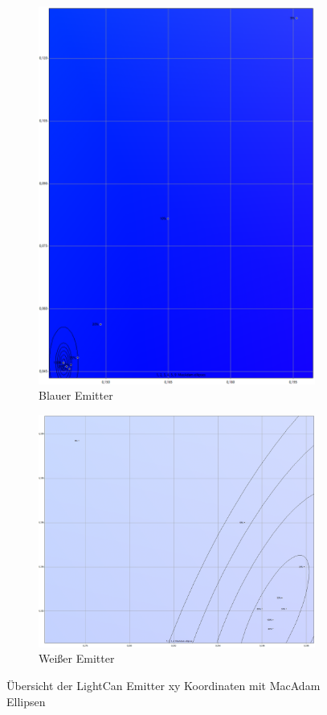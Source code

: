 \documentclass[11pt]{scrartcl}
\begin{document}
\begin{figure}[H]
    \begin{subfigure}[b]{.49\textwidth}
        \includegraphics[width=\textwidth]{images/macAdam/lightCanBlue.png}
        \caption{Blauer Emitter}
    \end{subfigure}
    \hfill 
    \begin{subfigure}[b]{.49\textwidth}
        \includegraphics[width=\textwidth]{images/macAdam/lightCanWhite.png}
        \caption{Weißer Emitter}
    \end{subfigure}
    \caption{Übersicht der LightCan Emitter xy Koordinaten mit MacAdam Ellipsen} \label{fig:macAdamLightCanEmitters}
\end{figure}
\end{document}

